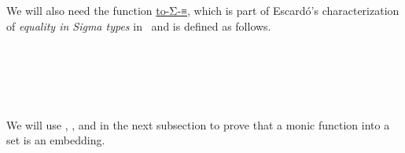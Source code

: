 We will also need the function
\href{https://www.cs.bham.ac.uk/~mhe/HoTT-UF-in-Agda-Lecture-Notes/HoTT-UF-Agda.html\#sigmaequality}{to-Σ-≡},
which is part of Escardó's characterization of \emph{equality in Sigma types} in~\cite{MHE} and is defined as follows.
\ccpad
\begin{code}%
\>[1]\AgdaSpace{}%
\AgdaSymbol{:}\AgdaSpace{}%
\>[111I]\AgdaSymbol{\{}\AgdaSpace{}%
\AgdaSymbol{:}\AgdaSpace{}%
\AgdaSpace{}%
%
\AgdaSymbol{\}}\AgdaSpace{}%
\AgdaSymbol{\{}\AgdaSpace{}%
\AgdaSymbol{:}\AgdaSpace{}%
\AgdaSpace{}%
\AgdaSpace{}%
\AgdaSpace{}%
%
\AgdaSymbol{\}}\AgdaSpace{}%
\AgdaSymbol{\{}\AgdaSpace{}%
\AgdaSpace{}%
\AgdaSymbol{:}\AgdaSpace{}%
\AgdaSpace{}%
\AgdaSymbol{\}}\<%
\\
\>[1][@{}l@{\AgdaIndent{0}}]%
\>[2]%
\>[.][@{}l@{}]\<[111I]%
\>[10]\AgdaSpace{}%
\AgdaSpace{}%
\AgdaSpace{}%
\AgdaSpace{}%
\AgdaSpace{}%
\AgdaSpace{}%
\AgdaSpace{}%
\AgdaSpace{}%
\AgdaSpace{}%
\AgdaSpace{}%
\AgdaFunction{,}\AgdaSpace{}%
\AgdaSymbol{(}\AgdaSpace{}%
\AgdaSpace{}%
\AgdaSpace{}%
\AgdaSpace{}%
\AgdaSpace{}%
\AgdaSymbol{)}\AgdaSpace{}%
\AgdaSpace{}%
\AgdaSpace{}%
\AgdaSpace{}%
\<%
\\
\>[2]%
\>[10]\AgdaSpace{}%
\AgdaSpace{}%
\<%
\\
%
\\[\AgdaEmptyExtraSkip]%
%
\>[1]\AgdaSpace{}%
\AgdaSymbol{(}\AgdaSpace{}%
\AgdaSymbol{\{}\AgdaSpace{}%
\AgdaSymbol{=}\AgdaSpace{}%
\AgdaSymbol{\}}\AgdaSpace{}%
\AgdaOperator{\AgdaInductiveConstructor{,}}\AgdaSpace{}%
\AgdaSpace{}%
\AgdaSymbol{\{}\AgdaSpace{}%
\AgdaSymbol{=}\AgdaSpace{}%
\AgdaSymbol{\})}\AgdaSpace{}%
\AgdaSymbol{=}\AgdaSpace{}%
\AgdaSpace{}%
\AgdaSymbol{\{}\AgdaSpace{}%
\AgdaSymbol{=}\AgdaSpace{}%
\AgdaSymbol{(}\AgdaSpace{}%
\AgdaOperator{\AgdaInductiveConstructor{,}}\AgdaSpace{}%
\AgdaSymbol{)\}}\<%
\end{code}
\ccpad
We will use , , and  in the next subsection to prove that a monic function into a set is an embedding.

